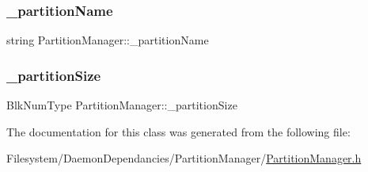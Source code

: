 \subsubsection{\texorpdfstring{\+\_\+partition\+Name}{\_partitionName}}
{\footnotesize\ttfamily string Partition\+Manager\+::\+\_\+partition\+Name\hspace{0.3cm}{\ttfamily [private]}}

\mbox{\label{class_partition_manager_adc40203c47c043cbef87bd5299462861}} 
\subsubsection{\texorpdfstring{\+\_\+partition\+Size}{\_partitionSize}}
{\footnotesize\ttfamily Blk\+Num\+Type Partition\+Manager\+::\+\_\+partition\+Size\hspace{0.3cm}{\ttfamily [private]}}



The documentation for this class was generated from the following file\+:\begin{DoxyCompactItemize}
\item 
Filesystem/\+Daemon\+Dependancies/\+Partition\+Manager/\mbox{\hyperlink{_partition_manager_8h}{Partition\+Manager.\+h}}\end{DoxyCompactItemize}
